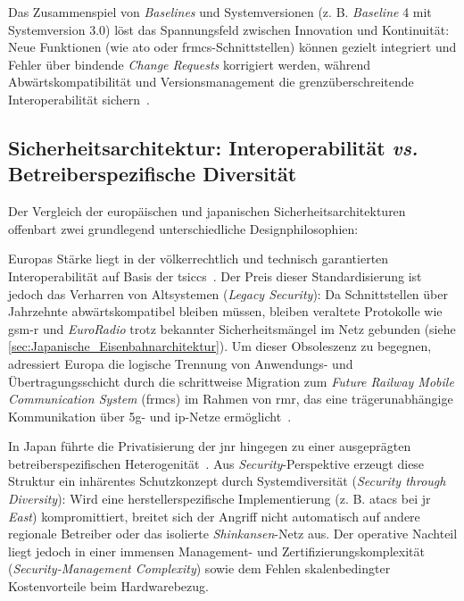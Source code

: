 \documentclass[runningheads]{res/llncs}
\begin{document}
Das Zusammenspiel von \textit{Baselines} und Systemversionen (z. B. \textit{Baseline} 4 mit Systemversion 3.0) löst das Spannungsfeld zwischen Innovation und Kontinuität: Neue Funktionen (wie \gls{ato} oder \gls{frmcs}-Schnittstellen) können gezielt integriert und Fehler über bindende \textit{Change Requests} korrigiert werden, während Abwärtskompatibilität und Versionsmanagement die grenzüberschreitende Interoperabilität sichern~\parencite[S. 53, 218--220]{trinckaufETCS2024}.

\subsection{Sicherheitsarchitektur: Interoperabilität \textit{vs.} Betreiberspezifische Diversität}
\label{sec:Sicherheitsarchitektur_Interoperabilität_vs_Betreiberspezifische_Diversität}
Der Vergleich der europäischen und japanischen Sicherheitsarchitekturen offenbart zwei grundlegend unterschiedliche Designphilosophien:

Europas Stärke liegt in der völkerrechtlich und technisch garantierten Interoperabilität auf Basis der \gls{tsiccs}~\parencite[S. 49]{trinckaufETCS2024}. Der Preis dieser Standardisierung ist jedoch das Verharren von Altsystemen (\textit{Legacy Security}): Da Schnittstellen über Jahrzehnte abwärtskompatibel bleiben müssen, bleiben veraltete Protokolle wie \gls{gsm-r} und \textit{EuroRadio} trotz bekannter Sicherheitsmängel im Netz gebunden (siehe \autoref{sec:Japanische_Eisenbahnarchitektur}). Um dieser Obsoleszenz zu begegnen, adressiert Europa die logische Trennung von Anwendungs- und Übertragungsschicht durch die schrittweise Migration zum \textit{Future Railway Mobile Communication System} (\gls{frmcs}) im Rahmen von \gls{rmr}, das eine trägerunabhängige Kommunikation über \gls{5g}- und \gls{ip}-Netze ermöglicht~\parencite[S. 123, 211]{trinckaufETCS2024}.

In Japan führte die Privatisierung der \gls{jnr} hingegen zu einer ausgeprägten betreiberspezifischen Heterogenität~\parencite[S. 47--49]{yanaseJapanese2011}. Aus \textit{Security}-Perspektive erzeugt diese Struktur ein inhärentes Schutzkonzept durch Systemdiversität (\textit{Security through Diversity}): Wird eine herstellerspezifische Implementierung (z. B. \gls{atacs} bei \gls{jr} \textit{East}) kompromittiert, breitet sich der Angriff nicht automatisch auf andere regionale Betreiber oder das isolierte \textit{Shinkansen}-Netz aus. Der operative Nachteil liegt jedoch in einer immensen Management- und Zertifizierungskomplexität (\textit{Security-Management Complexity}) sowie dem Fehlen skalenbedingter Kostenvorteile beim Hardwarebezug.
\end{document}
